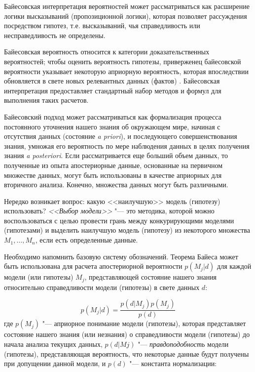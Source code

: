 Байесовская интерпретация вероятностей может рассматриваться как расширение логики высказываний (пропозиционной 
логики), которая позволяет рассуждения посредством гипотез, т.е. высказываний, чья справедливость или несправедливость 
не определены.

Байесовская вероятность относится к категории доказательственных вероятностей; чтобы оценить вероятность гипотезы, 
приверженец байесовской вероятности указывает некоторую априорную вероятность, которая впоследствии обновляется в 
свете новых релевантных данных (фактов) \cite{sivia2006data}. Байесовская интерпретация предоставляет стандартный 
набор методов и формул для выполнения таких расчетов.

Байесовский подход может рассматриваться как формализация процесса постоянного уточнения нашего знания об окружающем 
мире, начиная с отсутствия данных (состояние \textit{a priori}), и последующего совершенствования знания, умножая 
его вероятность по мере наблюдения данных в целях получения знания \textit{a posteriori}. Если рассматривается еще 
больший объем данных, то полученные из опыта апостериорные данные, основанные на первичном множестве данных, могут 
быть использованы в качестве априорных для вторичного анализа. Конечно, множества данных могут быть различными.

Нередко возникает вопрос: какую <<наилучшую>> модель (гипотезу) использовать? \textit{<<Выбор модели>>} "--- это 
методика, которой можно воспользоваться с целью провести грань между конкурирующими моделями (гипотезами) и выделить 
наилучшую модель (гипотезу) из некоторого множества ${M_1,\ldots, M_n}$, если есть определенные данные.

Необходимо напомнить базовую систему обозначений. Теорема Байеса может быть использована для расчета апостериорной 
вероятности $p(M_j|d)$ для каждой модели (или гипотезы) $M_j$, представляющей состояние нашего знания относительно 
справедливости модели (гипотезы) в свете данных $d$:

\begin{equation}
p(M_j|d) = \frac{p(d|M_j)p(M_j)}{p(d)} 
\end{equation}
где $p(M_j)$ "--- априорное понимание модели (гипотезы), которая представляет состояние нашего знания (или незнания) 
о справедливости модели (гипотезы) до начала анализа текущих данных, $p(d|Mj)$ "--- \textit{правдоподобность} модели 
(гипотезы), представляющая вероятность, что некоторые данные будут получены при допущении данной модели, 
и $p(d)$ "--- константа нормализации:

